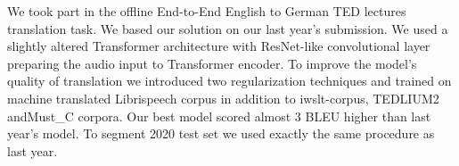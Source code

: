 We took part in the offline End-to-End English to German TED lectures translation task. We based our solution on our last year's submission. We used a slightly altered Transformer architecture with ResNet-like convolutional layer preparing the audio input to Transformer encoder. To improve the model's quality of translation we introduced two regularization techniques and trained on machine translated Librispeech corpus in addition to iwslt-corpus, TEDLIUM2 andMust\_C corpora. Our best model scored almost 3 BLEU higher than last year's model. To segment 2020 test set we used exactly the same procedure as last year.
